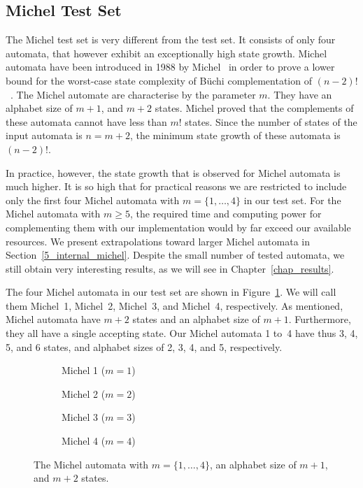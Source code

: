 \subsection{Michel Test Set}
\label{4_michel_testset}
The Michel test set is very different from the \goal{} test set. It consists of only four automata, that however exhibit an exceptionally high state growth. Michel automata have been introduced in 1988 by Michel~\cite{michel1988} in order to prove a lower bound for the worst-case state complexity of Büchi complementation of $(n-2)!$~\cite{1996_thomas}. The Michel automate are characterise by the parameter $m$. They have an alphabet size of $m+1$, and $m+2$ states. Michel proved that the complements of these automata cannot have less than $m!$ states. Since the number of states of the input automata is $n = m + 2$, the minimum state growth of these automata is $(n-2)!$.

In practice, however, the state growth that is observed for Michel automata is much higher. It is so high that for practical reasons we are restricted to include only the first four Michel automata with $m=\{1,\dots,4\}$ in our test set. For the Michel automata with $m \geq 5$, the required time and computing power for complementing them with our implementation would by far exceed our available resources. We present extrapolations toward larger Michel automata in Section~\ref{5_internal_michel}. Despite the small number of tested automata, we still obtain very interesting results, as we will see in Chapter~\ref{chap_results}.

The four Michel automata in our test set are shown in Figure~\ref{michel_automata}. We will call them Michel~1, Michel~2, Michel~3, and Michel~4, respectively. As mentioned, Michel automata have $m+2$ states and an alphabet size of $m+1$. Furthermore, they all have a single accepting state. Our Michel automata 1 to~4 have thus 3, 4, 5, and 6 states, and alphabet sizes of 2, 3, 4, and 5, respectively.

\def\subwidth{0.42}
\begin{figure}[htb!]
\centering
  \begin{subfigure}[t]{\subwidth\textwidth}
  \MichelOne
  \caption{Michel 1 ($m=1$)}
  \end{subfigure}
  \begin{subfigure}[t]{\subwidth\textwidth}
  \MichelTwo
  \caption{Michel 2 ($m=2$)}
  \end{subfigure}

  \begin{subfigure}[b]{\subwidth\textwidth}
  \MichelThree
  \caption{Michel 3 ($m=3$)}
  \end{subfigure}
  \begin{subfigure}[b]{\subwidth\textwidth}
  \MichelFour
  \caption{Michel 4 ($m=4$)}
  \end{subfigure}
\caption{The Michel automata with $m = \{1,\dots,4\}$, an alphabet size of $m+1$, and $m+2$ states.}
\label{michel_automata}
\end{figure}

